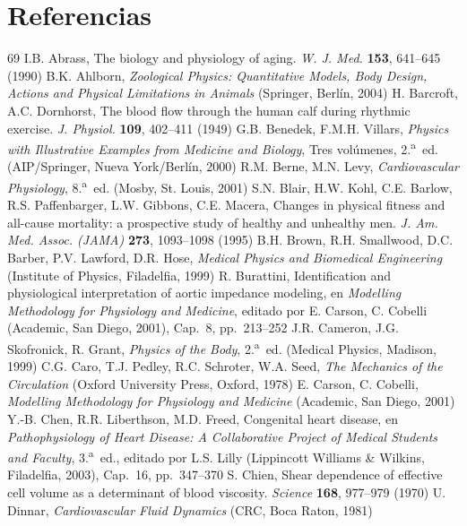 \documentclass[12pt]{book}
\begin{document}
\section*{Referencias}

\begin{thebibliography}{69}
 I.B. Abrass, The biology and physiology of aging. \textit{W. J. Med.} \textbf{153}, 641--645 (1990)
 B.K. Ahlborn, \textit{Zoological Physics: Quantitative Models, Body Design, Actions and Physical Limitations in Animals} (Springer, Berlín, 2004)
 H. Barcroft, A.C. Dornhorst, The blood flow through the human calf during rhythmic exercise. \textit{J. Physiol.} \textbf{109}, 402--411 (1949)
 G.B. Benedek, F.M.H. Villars, \textit{Physics with Illustrative Examples from Medicine and Biology}, Tres volúmenes, 2.\textsuperscript{a}~ed. (AIP/Springer, Nueva York/Berlín, 2000)
 R.M. Berne, M.N. Levy, \textit{Cardiovascular Physiology}, 8.\textsuperscript{a}~ed. (Mosby, St. Louis, 2001)
 S.N. Blair, H.W. Kohl, C.E. Barlow, R.S. Paffenbarger, L.W. Gibbons, C.E. Macera, Changes in physical fitness and all-cause mortality: a prospective study of healthy and unhealthy men. \textit{J. Am. Med. Assoc. (JAMA)} \textbf{273}, 1093--1098 (1995)
 B.H. Brown, R.H. Smallwood, D.C. Barber, P.V. Lawford, D.R. Hose, \textit{Medical Physics and Biomedical Engineering} (Institute of Physics, Filadelfia, 1999)
 R. Burattini, Identification and physiological interpretation of aortic impedance modeling, en \textit{Modelling Methodology for Physiology and Medicine}, editado por E. Carson, C. Cobelli (Academic, San Diego, 2001), Cap.~8, pp.~213--252
 J.R. Cameron, J.G. Skofronick, R. Grant, \textit{Physics of the Body}, 2.\textsuperscript{a}~ed. (Medical Physics, Madison, 1999)
 C.G. Caro, T.J. Pedley, R.C. Schroter, W.A. Seed, \textit{The Mechanics of the Circulation} (Oxford University Press, Oxford, 1978)
 E. Carson, C. Cobelli, \textit{Modelling Methodology for Physiology and Medicine} (Academic, San Diego, 2001)
 Y.-B. Chen, R.R. Liberthson, M.D. Freed, Congenital heart disease, en \textit{Pathophysiology of Heart Disease: A Collaborative Project of Medical Students and Faculty}, 3.\textsuperscript{a}~ed., editado por L.S. Lilly (Lippincott Williams \& Wilkins, Filadelfia, 2003), Cap.~16, pp.~347--370
 S. Chien, Shear dependence of effective cell volume as a determinant of blood viscosity. \textit{Science} \textbf{168}, 977--979 (1970)
 U. Dinnar, \textit{Cardiovascular Fluid Dynamics} (CRC, Boca Raton, 1981)

\end{thebibliography}
\end{document}
